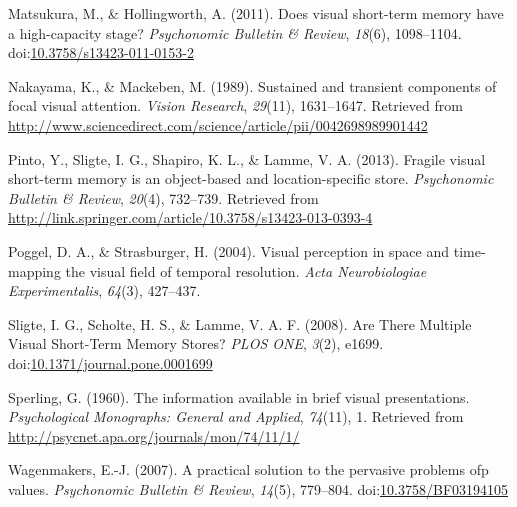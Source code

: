 \documentclass[,man,floatsintext]{apa6}
\theoremstyle{definition}
\theoremstyle{definition}
\theoremstyle{definition}
\theoremstyle{remark}
\begin{document}
\hypertarget{ref-matsukura_does_2011}{}
Matsukura, M., \& Hollingworth, A. (2011). Does visual short-term memory
have a high-capacity stage? \emph{Psychonomic Bulletin \& Review},
\emph{18}(6), 1098--1104.
doi:\href{https://doi.org/10.3758/s13423-011-0153-2}{10.3758/s13423-011-0153-2}

\hypertarget{ref-nakayama_sustained_1989}{}
Nakayama, K., \& Mackeben, M. (1989). Sustained and transient components
of focal visual attention. \emph{Vision Research}, \emph{29}(11),
1631--1647. Retrieved from
\url{http://www.sciencedirect.com/science/article/pii/0042698989901442}

\hypertarget{ref-pinto_fragile_2013}{}
Pinto, Y., Sligte, I. G., Shapiro, K. L., \& Lamme, V. A. (2013).
Fragile visual short-term memory is an object-based and
location-specific store. \emph{Psychonomic Bulletin \& Review},
\emph{20}(4), 732--739. Retrieved from
\url{http://link.springer.com/article/10.3758/s13423-013-0393-4}

\hypertarget{ref-poggel_visual_2004}{}
Poggel, D. A., \& Strasburger, H. (2004). Visual perception in space and
time-mapping the visual field of temporal resolution. \emph{Acta
Neurobiologiae Experimentalis}, \emph{64}(3), 427--437.

\hypertarget{ref-sligte_are_2008}{}
Sligte, I. G., Scholte, H. S., \& Lamme, V. A. F. (2008). Are There
Multiple Visual Short-Term Memory Stores? \emph{PLOS ONE}, \emph{3}(2),
e1699.
doi:\href{https://doi.org/10.1371/journal.pone.0001699}{10.1371/journal.pone.0001699}

\hypertarget{ref-sperling_information_1960}{}
Sperling, G. (1960). The information available in brief visual
presentations. \emph{Psychological Monographs: General and Applied},
\emph{74}(11), 1. Retrieved from
\url{http://psycnet.apa.org/journals/mon/74/11/1/}

\hypertarget{ref-wagenmakers_practical_2007}{}
Wagenmakers, E.-J. (2007). A practical solution to the pervasive
problems ofp values. \emph{Psychonomic Bulletin \& Review},
\emph{14}(5), 779--804.
doi:\href{https://doi.org/10.3758/BF03194105}{10.3758/BF03194105}
\end{document}
